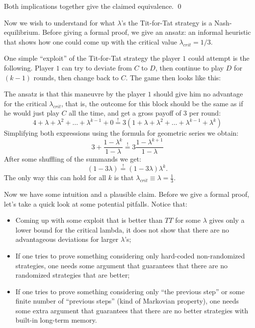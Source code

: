 \documentclass{scrartcl}
\newcommand{\subexercise}[1]{\vspace{0.8em}\noindent{\bf #1)}}
\begin{document}
Both implications together give the claimed equivalence. \hfill \qed

\subexercise{b} Now we wish to understand for what $\lambda$'s the 
Tit-for-Tat strategy is a Nash-equilibrium.
Before giving a formal proof, we give an ansatz: an informal 
heuristic that shows how one could come up with the critical value
$\lambda_{crit} = 1/3$.

  One simple ``exploit'' of the Tit-for-Tat strategy the
player $1$ could attempt is the following.
Player $1$ can try to deviate from $C$ to $D$, 
then continue to play $D$ for $(k-1)$ rounds, 
then change back to $C$. The game then looks like this:

\vspace{0.5em}

\vspace{0.5em}
The ansatz is that this maneuvre by the player $1$ should give 
him no advantage for the critical $\lambda_{crit}$, that is, the outcome
for this block should be the same as if he would just play $C$
all the time, and get a gross payoff of $3$ per round:
\[
  4 + \lambda + \lambda^2 + \dots + \lambda^{k-1} + 0 
  \overset{!}{=}
  3(1 + \lambda + \lambda^2 + \dots + \lambda^{k-1} + \lambda^{k})
\]
Simplifying both expressions using the formula for geometric series 
we obtain:
\[
  3 + \frac{1 - \lambda^k}{1 - \lambda} 
  \overset{!}{=}
  3\frac{1 - \lambda^{k + 1}}{1 - \lambda}
\]
After some shuffling of the summands we get:
\[
  (1-3\lambda) \overset{!}{=} (1-3\lambda)\lambda^k.
\]
The only way this can hold for all $k$ is that 
$\lambda_{crit}\equiv\lambda = \frac{1}{3}$.

Now we have some intuition and a plausible claim. Before we give a formal proof, let's
take a quick look at some potential pitfalls. Notice that:
\begin{itemize}
  \item Coming up with some exploit that is better than $TT$ for some $\lambda$
    gives only a lower bound for the critical lambda, it does not show that
    there are no advantageous deviations for larger $\lambda$'s;
  \item If one tries to prove something considering only hard-coded 
    non-randomized strategies, one needs some argument that guarantees that 
    there are no randomized strategies that are better;
  \item If one tries to prove something considering only ``the previous step''
    or some finite number of ``previous steps'' (kind of Markovian property), 
    one needs some extra argument that guarantees that there are no better strategies
    with built-in long-term memory.
\end{itemize}
\end{document}
